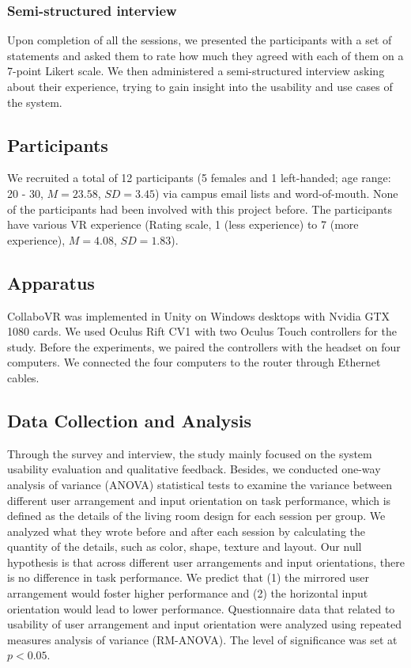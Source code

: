 \documentclass{sigchi}
\begin{document}
\subsubsection{Semi-structured interview}
Upon completion of all the sessions, we presented the participants with a set of statements and asked them to rate how much they agreed with each of them on a 7-point Likert scale. We then administered a semi-structured interview asking about their experience, trying to gain insight into the usability and use cases of the system.

\subsection{Participants}
We recruited a total of 12 participants (5 females and 1 left-handed; age range: 20 - 30, $M=23.58$, $SD=3.45$) via campus email lists and word-of-mouth. None of the participants had been involved with this project before. The participants have various VR experience (Rating scale, 1 (less experience) to 7 (more experience), $M=4.08$, $SD=1.83$).

\subsection{Apparatus}
CollaboVR was implemented in Unity on Windows desktops with Nvidia GTX 1080 cards. We used Oculus Rift CV1 with two Oculus Touch controllers for the study. Before the experiments, we paired the controllers with the headset on four computers. We connected the four computers to the router through Ethernet cables.

\subsection{Data Collection and Analysis}
Through the survey and interview, the study mainly focused on the system usability evaluation and qualitative feedback. Besides, we conducted one-way analysis of variance (ANOVA) statistical tests to examine the variance between different user arrangement and input orientation on task performance, which is defined as the details of the living room design for each session per group. We analyzed what they wrote before and after each session by calculating the quantity of the details, such as color, shape, texture and layout. Our null hypothesis is that across different user arrangements and input orientations, there is no difference in task performance. We predict that (1) the mirrored user arrangement would foster higher performance and (2) the horizontal input orientation would lead to lower performance. Questionnaire data that related to usability of user arrangement and input orientation were analyzed using repeated measures analysis of variance (RM-ANOVA). The level of significance was set at $p<0.05$.
\end{document}
